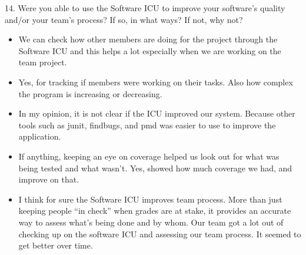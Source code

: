 \documentclass[11pt]{article}
\begin{document}
14. Were you able to use the Software ICU to improve your software's quality and/or your team's process? If so, in what ways? If not, why not? 
\begin{itemize}
\item We can check how other members are doing for the project through the Software ICU and this helps a lot especially when we are working on the team project. 
\item Yes, for tracking if members were working on their tasks. Also how complex the program is increasing or decreasing. 
\item In my opinion, it is not clear if the ICU improved our system.  Because other tools such as junit, findbugs, and pmd was easier to use to improve the application.
\item If anything, keeping an eye on coverage helped us look out for what was being tested and what wasn't.
Yes, showed how much coverage we had, and improve on that.
\item I think for sure the Software ICU improves team process. More than just keeping people ``in check'' when grades are at stake, it provides an accurate way to assess what's being done and by whom. Our team got a lot out of checking up on the software ICU and assessing our team process. It seemed to get better over time.


\end{itemize}
\end{document}
